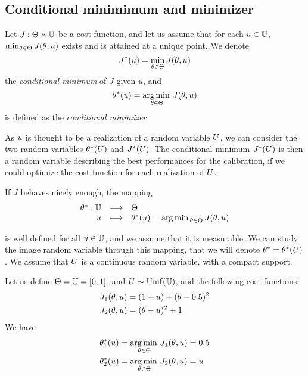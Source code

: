\documentclass[../../Main_ManuscritThese.tex]{subfiles}
\begin{document}
\subsection{Conditional minimimum and minimizer}
\label{sec:MPE}
\begin{definition}
  Let $J: \Theta \times \mathbb{U}$ be a cost function, and let us assume that for each $u \in \mathbb{U}$, $\min_{\theta \in \Theta} J(\theta,u)$ exists and is attained at a unique point.
  We denote
  \begin{equation}
    J^*(u) = \min_{\theta \in \Theta} J(\theta,u)
  \end{equation}
  the \emph{conditional minimum} of $J$ given $u$, and
  \begin{equation}
    \theta^*(u) = \operatorname*{arg\,min \,}_{\theta\in\Theta} J(\theta, u)
  \end{equation}
 is defined as the \emph{conditional minimizer}
\end{definition}
As $u$ is thought to be a realization of a random variable $U$, we can consider the two random variables $\theta^*(U)$ and $J^*(U)$.
The conditional minimum $J^*(U)$ is then a random variable describing the best performances for the calibration, if we could optimize the cost function for each realization of $U$. %


If $J$ behaves nicely enough, the mapping
\begin{equation}
  \label{eq:def_kstar}
  \begin{array}{rcl}
    \theta^*: \mathbb{U} &\longrightarrow& \Theta \\
    u &\longmapsto& \theta^*(u) = \operatorname*{arg\,min \,}_{\theta \in \Theta} J(\theta, u)
  \end{array}
\end{equation}

is well defined for all $u \in \mathbb{U}$, and we assume that it is measurable. We can study the image random variable through this mapping, that we will denote $\theta^* = \theta^*(U)$.
We assume that $U$ is a continuous random variable, with a compact support.

Let us define $\Theta = \mathbb{U}= [0, 1]$, and $U \sim \mathrm{Unif}(\mathbb{U})$, and the following cost functions:
\begin{align}
  J_1(\theta, u) &= (1+u)+(\theta - 0.5)^2\\
  J_2(\theta, u) &= (\theta-u)^2 + 1
\end{align}
We have
\begin{align}
  \theta^*_1(u) &= \operatorname*{arg\,min \,}_{\theta \in \Theta} J_1(\theta, u) = 0.5 \\
  \theta^*_2(u) &= \operatorname*{arg\,min \,}_{\theta\in\Theta} J_2(\theta, u) = u
\end{align}
\end{document}
